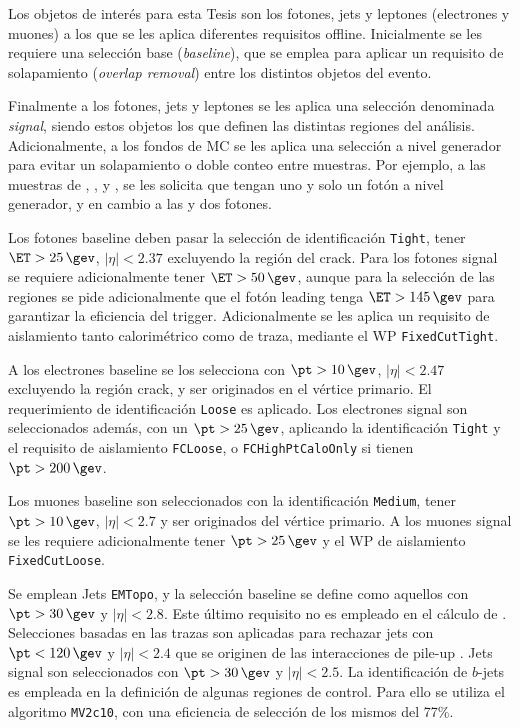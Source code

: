 Los objetos de interés para esta Tesis son los fotones, jets y leptones (electrones y muones) a los que se les aplica diferentes requisitos offline. Inicialmente se les requiere una selección base (\textit{baseline}),
que se emplea para aplicar un requisito de solapamiento (\textit{overlap removal}) entre los distintos objetos del evento.


Finalmente a los fotones, jets y leptones se les aplica una selección denominada \textit{signal}, siendo estos objetos los que definen las distintas regiones del análisis. Adicionalmente, a los fondos de MC se les aplica una selección a nivel generador para evitar un solapamiento o doble conteo entre muestras. Por ejemplo, a las muestras de \zph, \wph, \ttbarph y \phj, se les solicita que tengan uno y solo un fotón a nivel generador, y en cambio a las \zphph y \wphph dos fotones. 





Los fotones baseline deben pasar la selección de identificación \texttt{Tight}, tener $\ET>25\,\gev$, $|\eta|<2.37$ excluyendo la región del crack. Para los fotones signal se requiere adicionalmente tener $\ET>50\,\gev$, aunque para la selección de las regiones se pide adicionalmente que el fotón leading tenga $\ET>145\,\gev$ para garantizar la eficiencia del trigger. Adicionalmente se les aplica un requisito de aislamiento tanto calorimétrico como de traza, mediante el WP \texttt{FixedCutTight}.




A los electrones baseline se los selecciona con $\pt>10\,\gev$, $|\eta|<2.47$ excluyendo la región crack, y ser originados en el vértice primario. El requerimiento de identificación \texttt{Loose}
es aplicado. Los electrones signal son seleccionados además, con un $\pt>25\,\gev$, aplicando la identificación \texttt{Tight}
y el requisito de aislamiento \texttt{FCLoose}, o \texttt{FCHighPtCaloOnly} si tienen $\pt>200\,\gev$.




Los muones baseline son seleccionados con la identificación \texttt{Medium}, tener $\pt>10\,\gev$, $|\eta|<2.7$ y ser originados del vértice primario. A los muones signal se les requiere adicionalmente tener $\pt>25\,\gev$ y el WP de aislamiento \texttt{FixedCutLoose}.




Se emplean Jets \texttt{EMTopo}, y la selección baseline se define como aquellos con $\pt>30\,\gev$ y $|\eta|<2.8$. Este último requisito no es empleado en el cálculo de \met. Selecciones basadas en las trazas son aplicadas para rechazar jets con $\pt<120\,\gev$ y $|\eta|<2.4$ que se originen de las interacciones de pile-up \cite{ATL-PHYS-PUB-2014-001}. Jets signal son seleccionados con $\pt>30\,\gev$ y $|\eta|<2.5$. La identificación de $b$-jets es empleada en la definición de algunas regiones de control. Para ello se utiliza el algoritmo \texttt{MV2c10}, con una eficiencia de selección de los mismos del 77\%.



